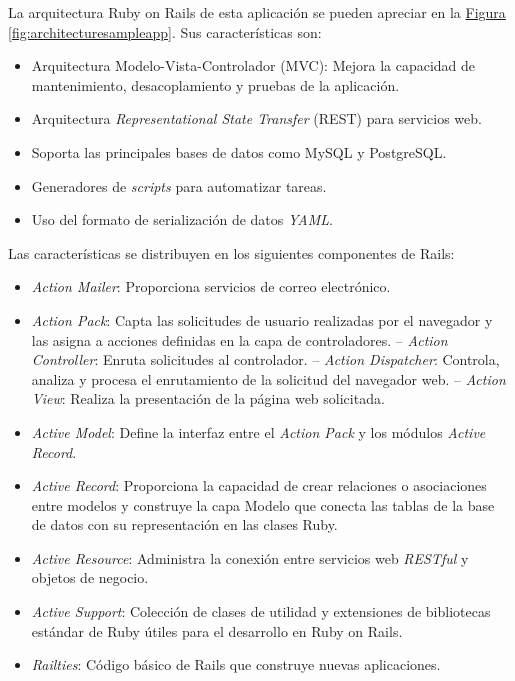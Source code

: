 La arquitectura Ruby on Rails de esta aplicación se pueden apreciar en la \hyperref[fig:architecturesampleapp]{Figura \ref{fig:architecturesampleapp}}. Sus características son:
\begin{itemize}
\item Arquitectura Modelo-Vista-Controlador (MVC): Mejora la capacidad de mantenimiento, desacoplamiento y pruebas de la aplicación.
\item Arquitectura \textit{Representational State Transfer} (REST) para servicios web.
\item Soporta las principales bases de datos como MySQL y PostgreSQL.
\item Generadores de \textit{scripts} para automatizar tareas.
\item Uso del formato de serialización de datos \textit{YAML}.
\end{itemize}

Las características se distribuyen en los siguientes componentes de Rails:
\begin{itemize}
\item \textit{Action Mailer}: Proporciona servicios de correo electrónico. 
\item \textit{Action Pack}: Capta las solicitudes de usuario realizadas por el navegador y las asigna a acciones definidas en la capa de controladores.
\subitem-- \textit{Action Controller}: Enruta solicitudes al controlador. 
\subitem-- \textit{Action Dispatcher}: Controla, analiza y procesa el enrutamiento de la solicitud del navegador web.
\subitem-- \textit{Action View}: Realiza la presentación de la página web solicitada.
\item \textit{Active Model}: Define la interfaz entre el \textit{Action Pack} y los módulos \textit{Active Record}.
\item \textit{Active Record}: Proporciona la capacidad de crear relaciones o asociaciones entre modelos y construye la capa Modelo que conecta las tablas de la base de datos con su representación en las clases Ruby.
\item \textit{Active Resource}: Administra la conexión entre servicios web \textit{RESTful} y objetos de negocio.
\item \textit{Active Support}: Colección de clases de utilidad y extensiones de bibliotecas estándar de Ruby útiles para el desarrollo en Ruby on Rails.
\item \textit{Railties}: Código básico de Rails que construye nuevas aplicaciones. 
\end{itemize}	

